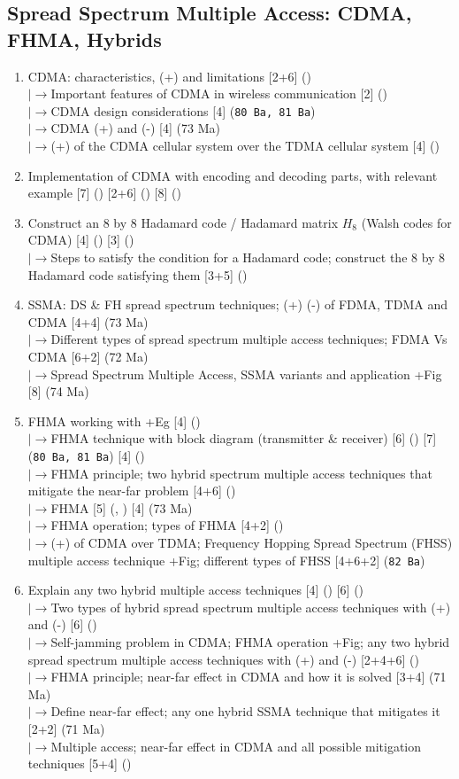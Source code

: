 \documentclass[12pt]{article}
\newcommand{\lb}{\\$\left|\rightarrow\right.$}
\begin{document}
  \subsection{Spread Spectrum Multiple Access: CDMA, FHMA, Hybrids}
    \begin{enumerate}[topsep=0pt, noitemsep]
      \item CDMA: characteristics, (+) and limitations \hfill [2+6] ()
        \lb Important features of CDMA in wireless communication \hfill [2] ()
        \lb CDMA design considerations \hfill [4] (\texttt{80 Ba, 81 Ba})
        \lb CDMA (+) and (-) \hfill [4] (73 Ma)
        \lb (+) of the CDMA cellular system over the TDMA cellular system \hfill [4] ()
      \item Implementation of CDMA with encoding and decoding parts, with relevant example
        \hfill [7] () [2+6] () [8] ()
      \item Construct an 8 by 8 Hadamard code / Hadamard matrix $H_8$ (Walsh codes for CDMA)
        \hfill [4] () [3] ()
        \lb Steps to satisfy the condition for a Hadamard code; construct the 8 by 8 Hadamard
        code satisfying them \hfill [3+5] ()
      \item SSMA: DS \& FH spread spectrum techniques; (+) (-) of FDMA, TDMA and CDMA \hfill [4+4] (73 Ma)
        \lb Different types of spread spectrum multiple access techniques; FDMA Vs CDMA \hfill [6+2] (72 Ma)
        \lb Spread Spectrum Multiple Access, SSMA variants and application +Fig \hfill [8] (74 Ma)
      \item FHMA working with +Eg \hfill [4] ()
        \lb FHMA technique with block diagram (transmitter \& receiver)
        \hfill [6] () [7] (\texttt{80 Ba, 81 Ba}) [4] ()
        \lb FHMA principle; two hybrid spectrum multiple access techniques that mitigate the
        near-far problem \hfill [4+6] ()
        \lb FHMA \hfill [5] (, ) [4] (73 Ma)
        \lb FHMA operation; types of FHMA \hfill [4+2] ()
        \lb (+) of CDMA over TDMA; Frequency Hopping Spread Spectrum (FHSS) multiple access
        technique +Fig; different types of FHSS \hfill [4+6+2] \mbox{(\texttt{82 Ba})}
      \item Explain any two hybrid multiple access techniques \hfill [4] () [6] ()
        \lb Two types of hybrid spread spectrum multiple access techniques with (+) and (-)
        \hfill [6] ()
        \lb Self-jamming problem in CDMA; FHMA operation +Fig; any two hybrid spread spectrum
        multiple access techniques with (+) and (-) \hfill [2+4+6] ()
        \lb FHMA principle; near-far effect in CDMA and how it is solved \hfill [3+4] (71 Ma)
        \lb Define near-far effect; any one hybrid SSMA technique that mitigates it \hfill [2+2] (71 Ma)
        \lb Multiple access; near-far effect in CDMA and all possible mitigation techniques
        \hfill [5+4] ()
    \end{enumerate}
\end{document}

